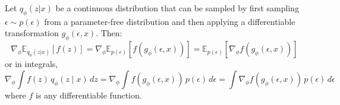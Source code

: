   \begin{theorem}
    \label{thm:reparameterization-trick}
    Let $q_\phi(z|x)$ be a continuous distribution that can be sampled by first sampling $\epsilon \sim p(\epsilon)$ from a parameter-free distribution and then applying a differentiable transformation $g_\phi(\epsilon, x)$. Then:
    \begin{equation}
       \nabla_\phi \mathbb{E}_{q_\phi(z|x)} [f(z)] = \nabla_\phi \mathbb{E}_{p(\epsilon)} [f(g_\phi(\epsilon, x))] = \mathbb{E}_{p(\epsilon)} [\nabla_\phi f(g_\phi(\epsilon, x))] 
     \end{equation}
    or in integrals, 
    \begin{equation}
     \nabla_\phi \int f(z) \, q_\phi (z \mid x) \,dz = \nabla_\phi \int f(g_\phi (\epsilon, x)) \, p(\epsilon) \,d\epsilon = \int \nabla_\phi f(g_\phi (\epsilon, x)) \, p(\epsilon) \, d\epsilon 
    \end{equation}
    where $f$ is any differentiable function. 
  \end{theorem}
